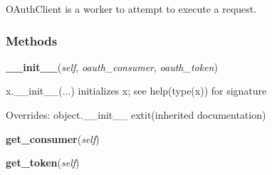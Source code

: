 OAuthClient is a worker to attempt to execute a request.



  \subsubsection{Methods}

    \vspace{0.5ex}

\hspace{.8\funcindent}\begin{boxedminipage}{\funcwidth}

    \raggedright \textbf{\_\_init\_\_}(\textit{self}, \textit{oauth\_consumer}, \textit{oauth\_token})

\setlength{\parskip}{2ex}
    x.\_\_init\_\_(...) initializes x; see help(type(x)) for signature

\setlength{\parskip}{1ex}
      Overrides: object.\_\_init\_\_ 	extit{(inherited documentation)}

    \end{boxedminipage}

    \label{lib:oauth:OAuthClient:get_consumer}

    \vspace{0.5ex}

\hspace{.8\funcindent}\begin{boxedminipage}{\funcwidth}

    \raggedright \textbf{get\_consumer}(\textit{self})

\setlength{\parskip}{2ex}
\setlength{\parskip}{1ex}
    \end{boxedminipage}

    \label{lib:oauth:OAuthClient:get_token}

    \vspace{0.5ex}

\hspace{.8\funcindent}\begin{boxedminipage}{\funcwidth}

    \raggedright \textbf{get\_token}(\textit{self})

\setlength{\parskip}{2ex}
\setlength{\parskip}{1ex}
    \end{boxedminipage}

